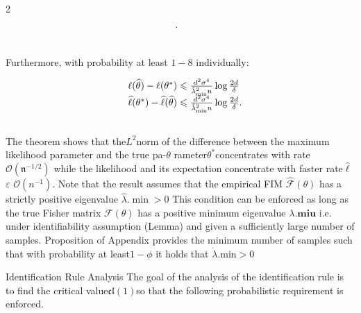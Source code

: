 \documentclass{article}
\begin{document}
\begin{paracol}{2}
\begin{equation}
\begin{array} { r l } & { \cdot } \\ & { \qquad }\end{array}
\end{equation}


Furthermore, with probability at least $1 - 8$ individually:


\begin{equation}
\begin{array} { r l } & { \ell ( \widehat { \theta } ) - \ell ( \theta ^ { * } ) \leqslant \frac { d ^ { 2 } \sigma ^ { 4 } } { \hat { \lambda } _ { \operatorname* { m i n } } ^ { 2 } n } \log \frac { 2 d } { \delta } } \\ & { \widehat { \ell } ( \theta ^ { * } ) - \widehat { \ell } ( \widehat { \theta } ) \leqslant \frac { d ^ { 2 } \sigma ^ { 4 } } { \hat { \lambda } _ { \operatorname* { m i n } } ^ { 2 } n } \log \frac { 2 d } { \delta }. } \\ & { \qquad }\end{array}
\end{equation}


The theorem shows that the$L ^ { 2 }$norm of the difference between the maximum likelihood parameter  and the true pa-$\theta$
rameter$\theta ^ { * }$concentrates with rate $\mathcal { O } ( \mathfrak { n } ^ { - 1 / 2 } )$ while the likelihood and its expectation concentrate with faster rate$\hat { \ell }$ $\varepsilon$
${ \mathcal { O } } ( n ^ { - 1 } ).$ Note that the result assumes that the empirical FIM
$\hat { \mathcal { F } } ( \theta )$ has a strictly positive eigenvalue $\hat { \lambda } . { \operatorname* { m i n } } > 0$ This condition can be enforced as long as the true Fisher matrix $\mathcal { F } ( \theta )$
has a positive minimum eigenvalue $\lambda . { \mathbf { m i u } }$ i.e. under identifiability assumption (Lemma) and given a sufficiently large
number of samples. Proposition of Appendix provides the
minimum number of samples such that with probability at
least$1 - \phi$ it holds that $\dot { \lambda } . { \mathrm { m i n } } > 0$


Identification Rule Analysis The goal of the analysis of
the identification rule is to find the critical value${ \mathfrak { c l } } ( 1 )$so that
the following probabilistic requirement is enforced.



\end{paracol}
\end{document}
